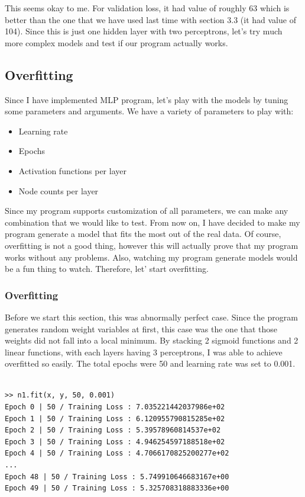 \documentclass{homework}
\newenvironment{code}{\captionsetup{type=listing}}{}
\begin{document}
This seems okay to me. For validation loss, it had value of roughly 63 which is better than the one that we have used last time with section 3.3 (it had value of 104). Since this is just one hidden layer with two perceptrons, let's try much more complex models and test if our program actually works. 
\pagebreak

\subsection{Overfitting}

Since I have implemented MLP program, let's play with the models by tuning some parameters and arguments. We have a variety of parameters to play with:

\begin{itemize}
    \item Learning rate
    \item Epochs
    \item Activation functions per layer
    \item Node counts per layer
\end{itemize}

Since my program supports customization of all parameters, we can make any combination that we would like to test. From now on, I have decided to make my program generate a model that fits the most out of the real data. Of course, overfitting is not a good thing, however this will actually prove that my program works without any problems. Also, watching my program generate models would be a fun thing to watch. Therefore, let' start overfitting.

\subsubsection{Overfitting}
Before we start this section, this was abnormally perfect case. Since the program generates random weight variables at first, this case was the one that those weights did not fall into a local minimum. By stacking 2 sigmoid functions and 2 linear functions, with each layers having 3 perceptrons, I was able to achieve overfitted so easily. The total epochs were 50 and learning rate was set to 0.001.
\\
\\
\begin{center}
\begin{code}
\begin{verbatim}
>> n1.fit(x, y, 50, 0.001)
Epoch 0 | 50 / Training Loss : 7.035221442037986e+02
Epoch 1 | 50 / Training Loss : 6.120955790815285e+02
Epoch 2 | 50 / Training Loss : 5.39578960814537e+02
Epoch 3 | 50 / Training Loss : 4.946254597188518e+02
Epoch 4 | 50 / Training Loss : 4.7066170825200277e+02
...
Epoch 48 | 50 / Training Loss : 5.749910646683167e+00
Epoch 49 | 50 / Training Loss : 5.325708318883336e+00
\end{verbatim}
\end{code}
\end{center}
\end{document}
